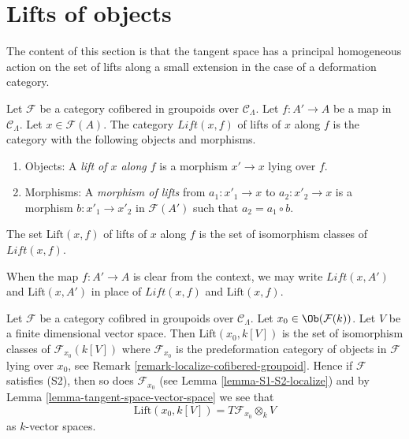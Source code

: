 \section{Lifts of objects}
\label{section-lifts}

\noindent
The content of this section is that the tangent space has a principal
homogeneous action on the set of lifts along a small extension
in the case of a deformation category.

\begin{definition}
\label{definition-lifts}
Let $\mathcal{F}$ be a category cofibered in groupoids over
$\mathcal{C}_\Lambda$. Let $f: A' \to A$ be a map in $\mathcal{C}_\Lambda$.
Let $x \in \mathcal{F}(A)$. The category $\textit{Lift}(x, f)$ of lifts of $x$
along $f$ is the category with the following objects and
morphisms.
\begin{enumerate}
\item Objects: A {\it lift of $x$ along $f$} is a morphism $x' \to x$
lying over $f$.
\item Morphisms: A {\it morphism of lifts} from $a_1 : x'_1 \to x$ to
$a_2 : x'_2 \to x$ is a morphism $b : x'_1 \to x'_2$ in
$\mathcal{F}(A')$ such that $a_2 = a_1 \circ b$.
\end{enumerate}
The set $\text{Lift}(x, f)$ of lifts of $x$ along $f$ is the set of
isomorphism classes of $\textit{Lift}(x, f)$.
\end{definition}

\begin{remark}
\label{remark-omit-arrow}
When the map $f: A' \to A$ is clear from the context, we may write
$\textit{Lift}(x, A')$ and $\text{Lift}(x, A')$ in place of
$\textit{Lift}(x, f)$ and $\text{Lift}(x, f)$.
\end{remark}

\begin{remark}
\label{remark-tangent-space-lifting}
Let $\mathcal{F}$ be a category cofibred in groupoids over
$\mathcal{C}_\Lambda$. Let $x_0 \in \Ob(\mathcal{F}(k))$.
Let $V$ be a finite dimensional vector space.
Then $\text{Lift}(x_0, k[V])$ is the set of isomorphism classes
of $\mathcal{F}_{x_0}(k[V])$ where $\mathcal{F}_{x_0}$ is the
predeformation category of objects in $\mathcal{F}$ lying over
$x_0$, see
Remark \ref{remark-localize-cofibered-groupoid}.
Hence if $\mathcal{F}$ satisfies (S2), then so does
$\mathcal{F}_{x_0}$ (see
Lemma \ref{lemma-S1-S2-localize})
and by
Lemma \ref{lemma-tangent-space-vector-space}
we see that
$$
\text{Lift}(x_0, k[V]) = T\mathcal{F}_{x_0} \otimes_k V
$$
as $k$-vector spaces.
\end{remark}

